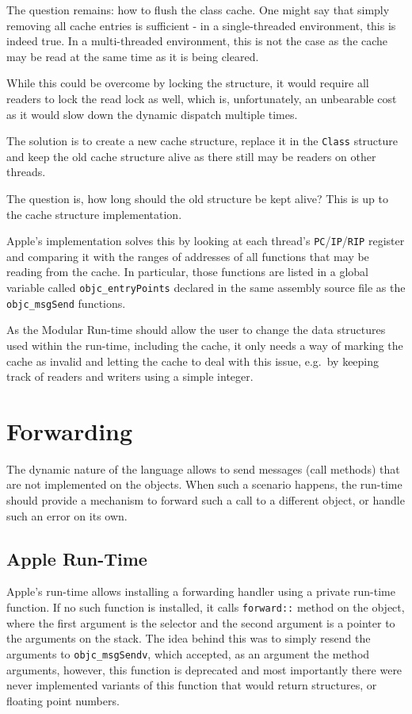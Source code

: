 The question remains: how to flush the class cache. One might say that simply removing all cache entries is sufficient - in a single-threaded environment, this is indeed true. In a multi-threaded environment, this is not the case as the cache may be read at the same time as it is being cleared.

While this could be overcome by locking the structure, it would require all readers to lock the read lock as well, which is, unfortunately, an unbearable cost as it would slow down the dynamic dispatch multiple times.

The solution is to create a new cache structure, replace it in the \verb=Class= structure and keep the old cache structure alive as there still may be readers on other threads.

The question is, how long should the old structure be kept alive? This is up to the cache structure implementation.

Apple's implementation solves this by looking at each thread's \verb=PC=/\verb=IP=/\verb=RIP= register and comparing it with the ranges of addresses of all functions that may be reading from the cache. In particular, those functions are listed in a global variable called \verb=objc_entryPoints= declared in the same assembly source file as the \verb=objc_msgSend= functions. 

As the Modular Run-time should allow the user to change the data structures used within the run-time, including the cache, it only needs a way of marking the cache as invalid and letting the cache to deal with this issue, e.g.\ by keeping track of readers and writers using a simple integer.

\section{Forwarding}

The dynamic nature of the language allows to send messages (call methods) that are not implemented on the objects. When such a scenario happens, the run-time should provide a mechanism to forward such a call to a different object, or handle such an error on its own.

\subsection{Apple Run-Time}

Apple's run-time allows installing a forwarding handler using a private run-time function. If no such function is installed, it calls \verb=forward::= method on the object, where the first argument is the selector and the second argument is a pointer to the arguments on the stack. The idea behind this was to simply resend the arguments to \verb=objc_msgSendv=, which accepted, as an argument the method arguments, however, this function is deprecated and most importantly there were never implemented variants of this function that would return structures, or floating point numbers.

